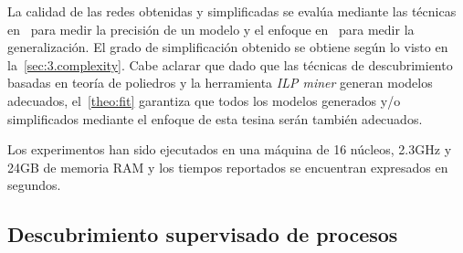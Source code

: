La calidad de las redes obtenidas y simplificadas se evalúa mediante las técnicas en~\cite{AMCDA15} para medir
la precisión de un modelo y el enfoque en~\cite{BrouckeWVB14} para medir la generalización. El grado de
simplificación obtenido se obtiene según lo visto en la~\autoref{sec:3.complexity}.
Cabe aclarar que dado que las técnicas de descubrimiento basadas en teoría de poliedros y la herramienta \textit{ILP miner}
generan modelos adecuados, el~\autoref{theo:fit} garantiza que todos los modelos generados y/o simplificados
mediante el enfoque de esta tesina serán también adecuados.

Los experimentos han sido ejecutados en una máquina de 16 núcleos, 2.3GHz y 24GB de memoria RAM y los tiempos
reportados se encuentran expresados en segundos.

\subsection{Descubrimiento supervisado de procesos}
\label{sec:4.supervised}



